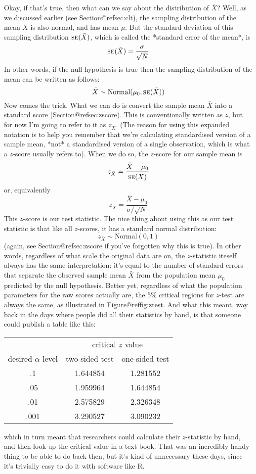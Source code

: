 Okay, if that's true, then what can we say about the distribution of $\bar{X}$? Well, as we discussed earlier (see Section@refsec:clt), the sampling distribution of the mean $\bar{X}$ is also normal, and has mean $\mu$. But the standard deviation of this sampling distribution $\mbox{\textsc{se}}(\bar{X})$, which is called the *standard error of the mean*, is
$$
\mbox{\textsc{se}}(\bar{X}) = \frac{\sigma}{\sqrt{N}}
$$
In other words, if the null hypothesis is true then the sampling distribution of the mean can be written as follows:
$$
\bar{X} \sim \mbox{Normal}(\mu_0,\mbox{\textsc{se}}(\bar{X}))
$$
Now comes the trick. What we can do is convert the sample mean $\bar{X}$ into a standard score (Section@refsec:zscore). This is conventionally written as $z$, but for now I'm going to refer to it as $z_{\bar{X}}$. (The reason for using this expanded notation is to help you remember that we're calculating standardised version of a sample mean, *not* a standardised version of a single observation, which is what a $z$-score usually refers to). When we do so, the $z$-score for our sample mean is 
$$
z_{\bar{X}} = \frac{\bar{X} - \mu_0}{\mbox{\textsc{se}}(\bar{X})}
$$
or, equivalently
$$
z_{\bar{X}} =  \frac{\bar{X} - \mu_0}{\sigma / \sqrt{N}}
$$
This $z$-score is our test statistic. The nice thing about using this as our test statistic is that like all $z$-scores, it has a standard normal distribution:
$$
z_{\bar{X}} \sim \mbox{Normal}(0,1)
$$
(again, see Section@refsec:zscore if you've forgotten why this is true). In other words, regardless of what scale the original data are on, the $z$-statistic iteself always has the same interpretation: it's equal to the number of standard errors that separate the observed sample mean $\bar{X}$ from the population mean $\mu_0$ predicted by the null hypothesis. Better yet, regardless of what the population parameters for the raw scores actually are, the 5\% critical regions for $z$-test are always the same, as illustrated in Figure@reffig:ztest. And what this meant, way back in the days where people did all their statistics by hand, is that someone could publish a table like this:
\begin{center}
\begin{tabular}{c|cc}
& \multicolumn{2}{|c}{critical $z$ value} \\
desired $\alpha$ level & two-sided test & one-sided test \\ \hline
.1  &  1.644854 & 1.281552 \\
.05 &  1.959964 & 1.644854 \\
.01 &  2.575829 & 2.326348 \\
.001&  3.290527 & 3.090232 \\
\end{tabular}
\end{center}
which in turn meant that researchers could calculate their $z$-statistic by hand, and then look up the critical value in a text book.  That was an incredibly handy thing to be able to do back then, but it's kind of unnecessary these days, since it's trivially easy to do it with software like R.


